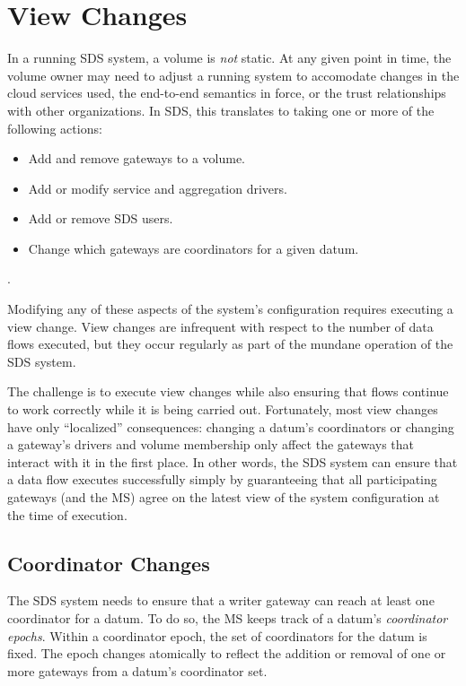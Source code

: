 \section{View Changes}
\label{sec:view-changes}

In a running SDS system, a volume is \emph{not} static.  At any given point in
time, the volume owner may need to adjust a running system to accomodate changes
in the cloud services used, the end-to-end semantics in force, or the trust
relationships with other organizations.  In SDS, this translates
to taking one or more of the following actions:

\begin{itemize}
   \item Add and remove gateways to a volume.
   \item Add or modify service and aggregation drivers.
   \item Add or remove SDS users.
   \item Change which gateways are coordinators for a given datum.
\end{itemize}.

Modifying any of these aspects of the system's configuration requires executing a
view change.  View changes are infrequent with respect to the number of data
flows executed, but they occur regularly as part of the mundane
operation of the SDS system.

The challenge is to execute view changes while also ensuring that flows
continue to work correctly while it is being carried out.
Fortunately, most view changes have only
``localized'' consequences:  changing a datum's coordinators or changing
a gateway's drivers and volume membership only affect the gateways that interact
with it in the first place.  In other words, the SDS system can ensure that a
data flow executes successfully simply by guaranteeing that all participating
gateways (and the MS) agree on the latest view of the system configuration at the
time of execution.

\subsection{Coordinator Changes}

The SDS system needs to ensure that a writer gateway can reach at least one
coordinator for a datum.  To do so, the MS keeps track of a datum's
\emph{coordinator epochs}.  Within a coordinator epoch, the set of coordinators for the
datum is fixed.  The epoch changes atomically to reflect the addition or removal of one
or more gateways from a datum's coordinator set.

